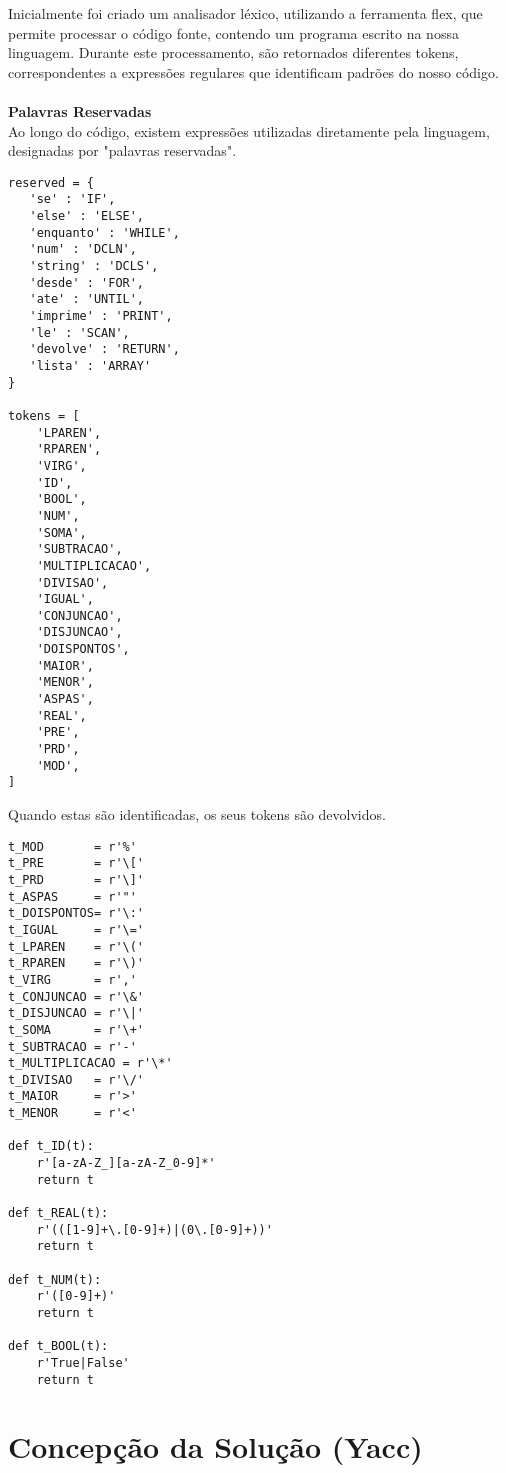 \documentclass[11pt,a4paper]{report}%
\begin{document}
Inicialmente foi criado um analisador léxico, utilizando a ferramenta flex, que permite processar o código fonte, contendo um programa escrito na nossa linguagem. Durante este processamento, são retornados diferentes tokens, correspondentes a expressões regulares que identificam padrões do nosso código.
\\
\\
\textbf{Palavras Reservadas} 
\\
Ao longo do código, existem expressões utilizadas diretamente pela linguagem, designadas por "palavras reservadas".

\begin{lstlisting}[frame=single,numbers=none]
reserved = {
   'se' : 'IF',
   'else' : 'ELSE',
   'enquanto' : 'WHILE',
   'num' : 'DCLN',
   'string' : 'DCLS',
   'desde' : 'FOR',
   'ate' : 'UNTIL',
   'imprime' : 'PRINT',
   'le' : 'SCAN',
   'devolve' : 'RETURN',
   'lista' : 'ARRAY'
}

tokens = [
    'LPAREN',
    'RPAREN',
    'VIRG',
    'ID',
    'BOOL', 
    'NUM',
    'SOMA',
    'SUBTRACAO',
    'MULTIPLICACAO',
    'DIVISAO',
    'IGUAL',
    'CONJUNCAO',
    'DISJUNCAO',
    'DOISPONTOS',
    'MAIOR',
    'MENOR',
    'ASPAS',
    'REAL',
    'PRE',
    'PRD',
    'MOD',
]
\end{lstlisting}

Quando estas são identificadas, os seus tokens são devolvidos.
\\
\begin{lstlisting}[frame=single,numbers=none]
t_MOD       = r'%'
t_PRE       = r'\['
t_PRD       = r'\]'
t_ASPAS     = r'"'
t_DOISPONTOS= r'\:'
t_IGUAL     = r'\='
t_LPAREN    = r'\('
t_RPAREN    = r'\)'
t_VIRG      = r','
t_CONJUNCAO = r'\&'
t_DISJUNCAO = r'\|' 
t_SOMA      = r'\+'
t_SUBTRACAO = r'-'
t_MULTIPLICACAO = r'\*'
t_DIVISAO   = r'\/'
t_MAIOR     = r'>'
t_MENOR     = r'<'

def t_ID(t):
    r'[a-zA-Z_][a-zA-Z_0-9]*'
    return t

def t_REAL(t): 
    r'(([1-9]+\.[0-9]+)|(0\.[0-9]+))'
    return t

def t_NUM(t): 
    r'([0-9]+)'
    return t 
    
def t_BOOL(t): 
    r'True|False'
    return t
\end{lstlisting}

\chapter{Concepção da Solução (Yacc)}
\end{document}
